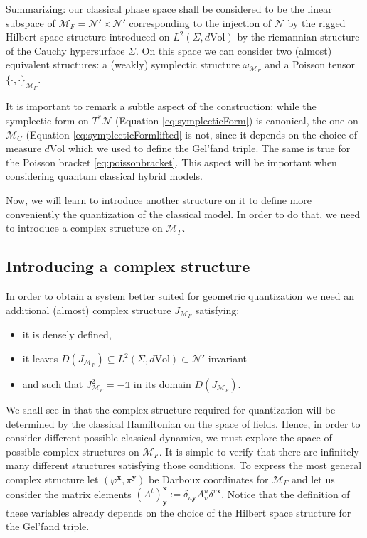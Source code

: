 \documentclass[12pt]{article}%
\begin{document}
Summarizing: our classical phase space shall be considered to be the linear subspace of $\mathcal{M}_F=\mathcal{N}'\times \mathcal{N}'$ corresponding to the injection of $\mathcal{N}$ by the rigged Hilbert space structure introduced on $L^2(\Sigma, d\textrm{Vol})$ by the riemannian structure of the Cauchy hypersurface $\Sigma$. On this space we can consider two (almost) equivalent structures: a (weakly) symplectic structure $\omega_{\mathcal{M}_F}$ and a Poisson tensor $\{ \cdot, \cdot \}_{\mathcal{M}_F}$.  

It is important to remark a subtle aspect of the construction: while the symplectic form on $T^*\mathcal{N}$ (Equation \eqref{eq:symplecticForm}) is canonical, the one on $\mathcal{M}_C$ (Equation \eqref{eq:symplecticFormlifted}   is not, since it depends on the choice of measure $d\mathrm{Vol}$ which we used to define the Gel'fand triple. The same is true for the Poisson bracket \eqref{eq:poissonbracket}. This aspect will be important when considering quantum classical hybrid models.


Now, we will learn to introduce another structure on it to define more conveniently the quantization of the classical model. In order to do that, we need to introduce a complex structure on $\mathcal{M}_F$.

\subsection{Introducing a complex structure}
In order to obtain a system better  suited for geometric quantization we need an additional (almost) complex structure $J_{\mathcal{M}_F}$ satisfying:
\begin{itemize}
	\item it is densely defined,
	\item  it leaves $D(J_{\mathcal{M}_F})\subseteq L^2(\Sigma,d\textrm{Vol})\subset \mathcal{N}'$ invariant
	\item and such that $J_{\mathcal{M}_F}^2=-\mathds{1}$ in its domain $D(J_{\mathcal{M}_F})$.
\end{itemize}

We shall see  in \cite{alonso2023a} that the complex structure required for quantization will be determined by the classical Hamiltonian on the space of fields. Hence, in order to consider different possible classical dynamics, we must explore the space of possible complex structures on $\mathcal{M}_F$.  It is simple to verify that there are infinitely many different structures satisfying those conditions. To express the most general complex structure let $(\varphi^{\mathbf{x}},\pi^{\mathbf{y}})$ be Darboux coordinates for $\mathcal{M}_F$ and let us consider the matrix elements $(A^t)^{\mathbf{x}}_\mathbf{y}:= \delta_{u \mathbf{y}} A^u_v\delta^{v\mathbf{x}}$. Notice that the definition of these variables already depends on the choice of the Hilbert space structure for the Gel'fand triple.
\end{document}
